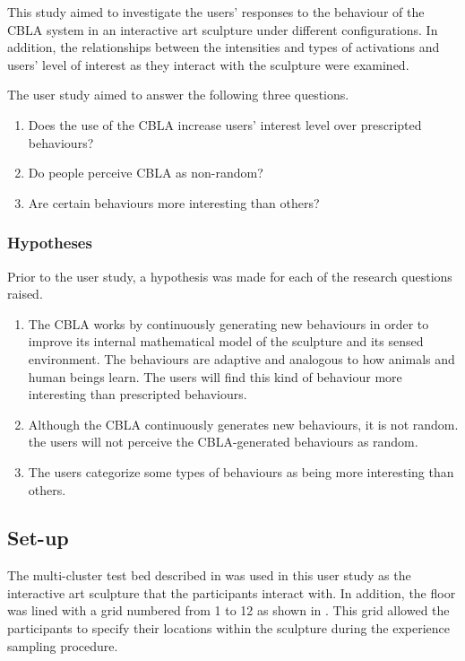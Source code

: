 This study aimed to investigate the users' responses to the behaviour of the CBLA system in an interactive art sculpture under different configurations. In addition, the relationships between the intensities and types of activations and users' level of interest as they interact with the sculpture were examined.

The user study aimed to answer the following three questions.

\begin{enumerate}
	\item Does the use of the CBLA increase users' interest level over prescripted behaviours?\label{itm:research-q1}
	\item Do people perceive CBLA as non-random?\label{itm:research-q2}
	\item Are certain behaviours  more interesting than others?\label{itm:research-q3}
\end{enumerate}


\subsubsection{Hypotheses}

Prior to the user study, a hypothesis was made for each of the research questions raised.

\begin{enumerate}
	\item The CBLA works by continuously generating new behaviours in order to improve its internal mathematical model of the sculpture and its sensed environment. The behaviours are adaptive and analogous to how animals and human beings learn. The users will find this kind of behaviour more interesting than prescripted behaviours.
	\item Although the CBLA continuously generates new behaviours, it is not random. the users will not perceive the CBLA-generated behaviours as random. 
	\item The users categorize some types of behaviours as being more interesting than others. 
\end{enumerate}

\subsection{Set-up}

The multi-cluster test bed described in  was used in this user study as the interactive art sculpture that the participants interact with. In addition, the floor was lined with a grid numbered from 1 to 12 as shown in . This grid allowed the participants to specify their locations within the sculpture during the experience sampling procedure.  

